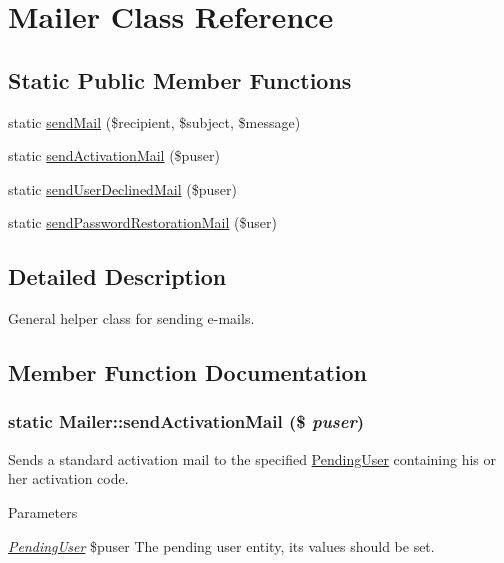 \hypertarget{classMailer}{
\section{Mailer Class Reference}
\label{classMailer}
}
\subsection*{Static Public Member Functions}
\begin{DoxyCompactItemize}
\item 
static \hyperlink{classMailer_a5eca35182ea74f3233ad375a07716639}{sendMail} (\$recipient, \$subject, \$message)
\item 
static \hyperlink{classMailer_a43f62956ab5ae7d52d4d1dae31de7ac5}{sendActivationMail} (\$puser)
\item 
static \hyperlink{classMailer_a44f0dba87089ce36ee3faba019958ffe}{sendUserDeclinedMail} (\$puser)
\item 
static \hyperlink{classMailer_ae8402e99832c34bbe8b49fdb9b2f5cc8}{sendPasswordRestorationMail} (\$user)
\end{DoxyCompactItemize}


\subsection{Detailed Description}
General helper class for sending e-\/mails. 

\subsection{Member Function Documentation}
\hypertarget{classMailer_a43f62956ab5ae7d52d4d1dae31de7ac5}{
\subsubsection[{sendActivationMail}]{\setlength{\rightskip}{0pt plus 5cm}static Mailer::sendActivationMail (\$ {\em puser})}}
\label{classMailer_a43f62956ab5ae7d52d4d1dae31de7ac5}
Sends a standard activation mail to the specified \hyperlink{classPendingUser}{PendingUser} containing his or her activation code.


\begin{DoxyParams}{Parameters}
\item[{\em \hyperlink{classPendingUser}{PendingUser}}]\$puser The pending user entity, its values should be set.\end{DoxyParams}

